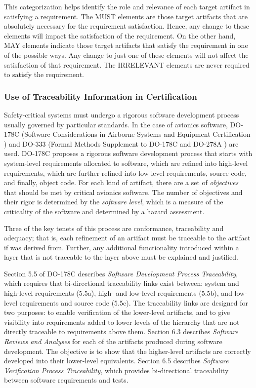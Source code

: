 This categorization helps identify the role and relevance of each target artifact in satisfying a requirement. The MUST elements are those target artifacts that are absolutely necessary for the requirement satisfaction. Hence, any change to these elements will impact the satisfaction of the requirement. On the other hand, MAY elements indicate those target artifacts that satisfy the requirement in one of the possible ways.  Any change to just one of these elements will not affect the satisfaction of that requirement. The IRRELEVANT elements are never required to satisfy the requirement.

\subsubsection{Use of Traceability Information in Certification}
Safety-critical systems must undergo a rigorous software development process usually governed by particular standards.  In the case of avionics software, DO-178C (Software Considerations in Airborne Systems and Equipment Certification \cite{DO178C}) and DO-333 (Formal Methods Supplement to DO-178C and DO-278A \cite{DO333}) are used.
DO-178C proposes a rigorous software development process that starts with system-level requirements allocated to software, which are refined into high-level requirements, which are further refined into low-level requirements, source code, and finally, object code. For each kind of artifact, there are a set of {\em objectives} that should be met by critical avionics software.  The number of objectives and their rigor is determined by the {\em software level}, which is a measure of the criticality of the software and determined by a hazard assessment.

Three of the key tenets of this process are conformance, traceability and adequacy; that is, each refinement of an artifact must be traceable to the artifact if was derived from. Further, any additional functionality introduced within a layer that is not traceable to the layer above must be explained and justified.

Section 5.5 of DO-178C describes {\em Software Development Process Traceability}, which requires that bi-directional traceability links exist between: system and high-level requirements (5.5a), high- and low-level requirements (5.5b), and low-level requirements and source code (5.5c).  The traceability links are designed for two purposes: to enable verification of the lower-level artifacts, and to give visibility into requirements added to lower levels of the hierarchy that are not directly traceable to requirements above them.
Section 6.3 describes {\em Software Reviews and Analyses} for each of the artifacts produced during software development.   The objective is to show that the higher-level artifacts are correctly developed into their lower-level equivalents.
%
%
Section 6.5 describes {\em Software Verification Process Traceability}, which provides bi-directional traceability between software requirements and tests.  


